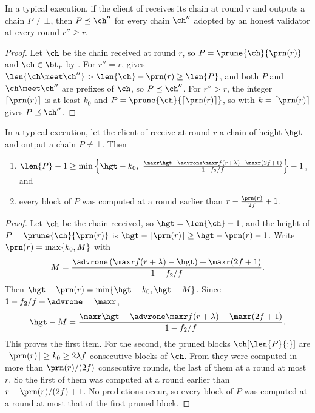 \begin{corollary}[Safety]\label{cor.prune}
    In a typical execution, if the client of  receives its
    chain at round $r$ and outputs a chain $P\ne\bot$, then $P\preceq\ch''$ for
    every chain $\ch''$ adopted by an honest validator at every round
    $r''\ge r$.
\end{corollary}
\begin{proof}
    Let $\ch$ be the chain received at round $r$, so $P=\prune{\ch}{\prn(r)}$
    and $\ch\in\bt_r$ by . For $r''=r$, 
    gives $\len{\ch\meet\ch''}>\len{\ch}-\prn(r)\ge\len{P}$, and both $P$ and
    $\ch\meet\ch''$ are prefixes of $\ch$, so $P\preceq\ch''$. For $r''>r$, the integer $\lceil\prn(r)\rceil$ is at least $k_0$ and
    $P=\prune{\ch}{\lceil\prn(r)\rceil}$, so  with
    $k=\lceil\prn(r)\rceil$ gives $P\preceq\ch''$.
\end{proof}

\begin{corollary}[Growth]\label{cor.growth}
    In a typical execution, let the client of  receive at
    round $r$ a chain of height $\hgt$ and output a chain $P\ne\bot$. Then
    \begin{enumerate}
        \item $\len{P}-1\ge\min\left\{\hgt-k_0,\
            \frac{\maxr\hgt-\advrone\maxr f(r+\lambda)-\maxr(2f+1)}{1-f_2/f}\right\}-1$,
            and
        \item every block of $P$ was computed at a round earlier than
            $r-\frac{\prn(r)}{2f}+1$.
    \end{enumerate}
\end{corollary}
\begin{proof}
    Let $\ch$ be the chain received, so $\hgt=\len{\ch}-1$, and the height of
    $P=\prune{\ch}{\prn(r)}$ is $\hgt-\lceil\prn(r)\rceil\ge\hgt-\prn(r)-1$.
    Write $\prn(r)=\max\{k_0,M\}$ with
    \[
        M=\frac{\advrone\left(\maxr f(r+\lambda)-\hgt\right)+\maxr(2f+1)}{1-f_2/f}.
    \]
    Then $\hgt-\prn(r)=\min\{\hgt-k_0,\hgt-M\}$. Since
    $1-f_2/f+\advrone=\maxr$,
    \[
        \hgt-M=\frac{\maxr\hgt-\advrone\maxr f(r+\lambda)-\maxr(2f+1)}{1-f_2/f}.
    \]
    This proves the first item. For the second, the pruned blocks
    $\ch[\len{P}{:}]$ are $\lceil\prn(r)\rceil\ge k_0\ge2\lambda f$ consecutive
    blocks of $\ch$. From \Cref{lem.span} they were computed in more than
    $\prn(r)/(2f)$ consecutive rounds, the last of them at a round at most
    $r$. So the first of them was computed at a round earlier than
    $r-\prn(r)/(2f)+1$. No predictions occur, so every block of $P$ was
    computed at a round at most that of the first pruned block.
\end{proof}

